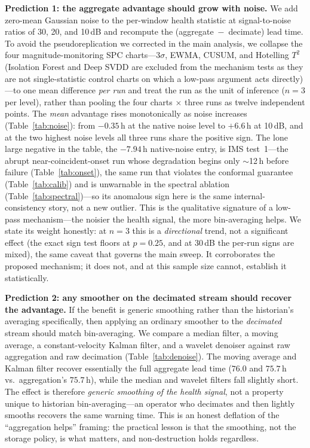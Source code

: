 \documentclass[journal]{IEEEtran}
\begin{document}
\textbf{Prediction 1: the aggregate advantage should grow with noise.} We add
zero-mean Gaussian noise to the per-window health statistic at signal-to-noise
ratios of 30, 20, and 10\,dB and recompute the (aggregate~$-$~decimate) lead
time. To avoid the pseudoreplication we corrected in the main analysis, we
collapse the four magnitude-monitoring SPC charts---3$\sigma$, EWMA, CUSUM, and
Hotelling $T^2$ (Isolation Forest and Deep SVDD are excluded from the mechanism
tests as they are not single-statistic control charts on which a low-pass
argument acts directly)---to one mean difference \emph{per
run} and treat the run as the unit of inference ($n{=}3$ per level), rather than
pooling the four charts $\times$ three runs as twelve independent points. The
\emph{mean} advantage rises monotonically as noise increases
(Table~\ref{tab:noise}): from $-0.35$\,h at the native noise level to $+6.6$\,h
at 10\,dB, and at the two highest noise levels all three runs share the positive
sign. The lone large negative in the table, the $-7.94$\,h native-noise entry, is
IMS test~1---the abrupt near-coincident-onset run whose degradation begins only
$\sim$12\,h before failure (Table~\ref{tab:onset}), the same run that violates the
conformal guarantee (Table~\ref{tab:calib}) and is unwarnable in the spectral
ablation (Table~\ref{tab:spectral})---so its anomalous sign here is the same
internal-consistency story, not a new outlier. This is the qualitative signature of a low-pass mechanism---the noisier the
health signal, the more bin-averaging helps. We state its weight honestly: at
$n{=}3$ this is a \emph{directional} trend, not a significant effect (the exact
sign test floors at $p{=}0.25$, and at 30\,dB the per-run signs are mixed), the
same caveat that governs the main sweep. It corroborates the proposed mechanism;
it does not, and at this sample size cannot, establish it statistically.

\textbf{Prediction 2: any smoother on the decimated stream should recover the
advantage.} If the benefit is generic smoothing rather than the historian's
averaging specifically, then applying an ordinary smoother to the
\emph{decimated} stream should match bin-averaging. We compare a median filter,
a moving average, a constant-velocity Kalman filter, and a wavelet denoiser
against raw aggregation and raw decimation (Table~\ref{tab:denoise}). The moving
average and Kalman filter recover essentially the full aggregate lead time
($76.0$ and $75.7$\,h vs.\ aggregation's $75.7$\,h), while the median and wavelet
filters fall slightly short. The effect is therefore \emph{generic smoothing of
the health signal}, not a property unique to historian bin-averaging---an
operator who decimates and then lightly smooths recovers the same warning time.
This is an honest deflation of the ``aggregation helps'' framing: the practical
lesson is that the smoothing, not the storage policy, is what matters, and
non-destruction holds regardless.
\end{document}

